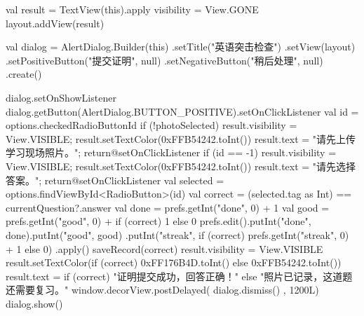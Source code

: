 {{        val result = TextView(this).apply { visibility = View.GONE }
        layout.addView(result)

        val dialog = AlertDialog.Builder(this)
            .setTitle("英语突击检查")
            .setView(layout)
            .setPositiveButton("提交证明", null)
            .setNegativeButton("稍后处理", null)
            .create()

        dialog.setOnShowListener {
            dialog.getButton(AlertDialog.BUTTON_POSITIVE).setOnClickListener {
                val id = options.checkedRadioButtonId
                if (!photoSelected) {
                    result.visibility = View.VISIBLE; result.setTextColor(0xFFB54242.toInt())
                    result.text = "请先上传学习现场照片。"; return@setOnClickListener
                }
                if (id == -1) {
                    result.visibility = View.VISIBLE; result.setTextColor(0xFFB54242.toInt())
                    result.text = "请先选择答案。"; return@setOnClickListener
                }
                val selected = options.findViewById<RadioButton>(id)
                val correct = (selected.tag as Int) == currentQuestion?.answer
                val done = prefs.getInt("done", 0) + 1
                val good = prefs.getInt("good", 0) + if (correct) 1 else 0
                prefs.edit().putInt("done", done).putInt("good", good)
                    .putInt("streak", if (correct) prefs.getInt("streak", 0) + 1 else 0)
                    .apply()
                saveRecord(correct)
                result.visibility = View.VISIBLE
                result.setTextColor(if (correct) 0xFF176B4D.toInt() else 0xFFB54242.toInt())
                result.text = if (correct) "证明提交成功，回答正确！" else "照片已记录，这道题还需要复习。"
                window.decorView.postDelayed({ dialog.dismiss() }, 1200L)
            }
        }
        dialog.show()
    }
}
